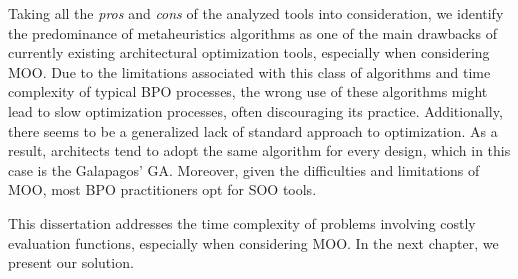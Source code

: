 	Taking all the \textit{pros} and \textit{cons} of the analyzed tools into consideration, we identify the predominance of metaheuristics algorithms as one of the main drawbacks of currently existing architectural optimization tools, especially when considering \ac{MOO}. Due to the limitations associated with this class of algorithms and time complexity of typical \ac{BPO} processes, the wrong use of these algorithms might lead to slow optimization processes, often discouraging its practice. Additionally, there seems to be a generalized lack of standard approach to optimization. As a result, architects tend to adopt the same algorithm for every design, which in this case is the Galapagos' \ac{GA}. Moreover, given the difficulties and limitations of \ac{MOO}, most \ac{BPO} practitioners opt for \ac{SOO} tools. 
		
	This dissertation addresses the time complexity of problems involving costly evaluation functions, especially when considering \ac{MOO}. In the next chapter, we present our solution.
		